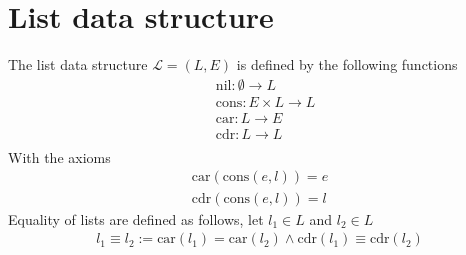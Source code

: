 \documentclass{article}
\begin{document}
\section{List data structure}
The list data structure $\mathcal{L} = (L,E)$ is defined by the following
functions
\begin{align*}
	&\text{nil}: \emptyset \rightarrow L \\
	&\text{cons}: E \times L \rightarrow L \\
	&\text{car}: L \rightarrow E \\
	&\text{cdr}: L \rightarrow L \\
\end{align*}
With the axioms
\begin{align*}
	\text{car}(\text{cons}(e,l)) = e \\
	\text{cdr}(\text{cons}(e,l)) = l
\end{align*}
Equality of lists are defined as follows, let $l_1 \in L$ and $l_2 \in L$
\begin{align*}
	l_1 \equiv l_2 := \text{car}(l_1) = \text{car}(l_2) \land 
	\text{cdr}(l_1) \equiv \text{cdr}(l_2)
\end{align*}
\end{document}
